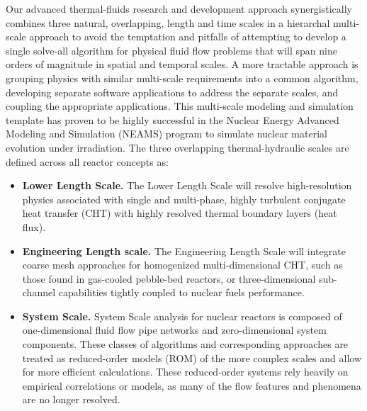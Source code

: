 Our advanced thermal-fluids research and development approach synergistically combines three natural, overlapping, length and time scales in a hierarchal multi-scale approach to avoid the temptation and
pitfalls of attempting to develop a single solve-all algorithm for physical fluid flow problems that will span nine orders of magnitude in spatial and temporal scales. A more tractable approach is grouping physics with similar multi-scale requirements into a common algorithm, developing separate software applications to address the separate scales, and coupling the appropriate applications. This multi-scale modeling and simulation template has proven to be highly successful in the Nuclear Energy Advanced Modeling and Simulation (NEAMS) program to simulate nuclear material evolution under irradiation. The three overlapping thermal-hydraulic scales are defined across all reactor concepts as:
\begin{itemize}
    \item \textbf{Lower Length Scale.} The Lower Length Scale will resolve high-resolution physics
    associated with single and multi-phase, highly turbulent conjugate heat transfer (CHT) with highly
    resolved thermal boundary layers (heat flux).
    \item \textbf{Engineering Length scale.} The Engineering Length Scale will integrate coarse mesh approaches
    for homogenized multi-dimensional CHT, such as those found in gas-cooled pebble-bed reactors, or three-dimensional sub-channel capabilities tightly coupled to nuclear fuels performance.
    \item \textbf{System Scale.} System Scale analysis for nuclear reactors is composed of one-dimensional fluid flow
    pipe networks and zero-dimensional system components. These classes of algorithms and corresponding approaches are treated as reduced-order models (ROM) of the more complex scales and allow for more efficient calculations. These reduced-order systems rely heavily on empirical correlations or models, as many of the flow features and phenomena are no longer resolved.
\end{itemize}

